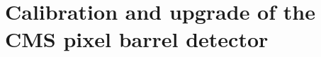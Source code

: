\documentclass[a4paper, 11pt, twoside, openany]{ThesisStyle}
\begin{document}
			

	

	
	
	

	
	
\part{Calibration and upgrade of the CMS pixel barrel detector}

	
	
	

	
	
\end{document}
